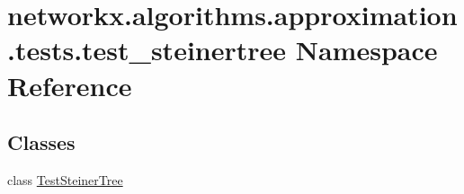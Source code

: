 \hypertarget{namespacenetworkx_1_1algorithms_1_1approximation_1_1tests_1_1test__steinertree}{}\section{networkx.\+algorithms.\+approximation.\+tests.\+test\+\_\+steinertree Namespace Reference}
\label{namespacenetworkx_1_1algorithms_1_1approximation_1_1tests_1_1test__steinertree}
\subsection*{Classes}
\begin{DoxyCompactItemize}
\item 
class \hyperlink{classnetworkx_1_1algorithms_1_1approximation_1_1tests_1_1test__steinertree_1_1TestSteinerTree}{Test\+Steiner\+Tree}
\end{DoxyCompactItemize}
